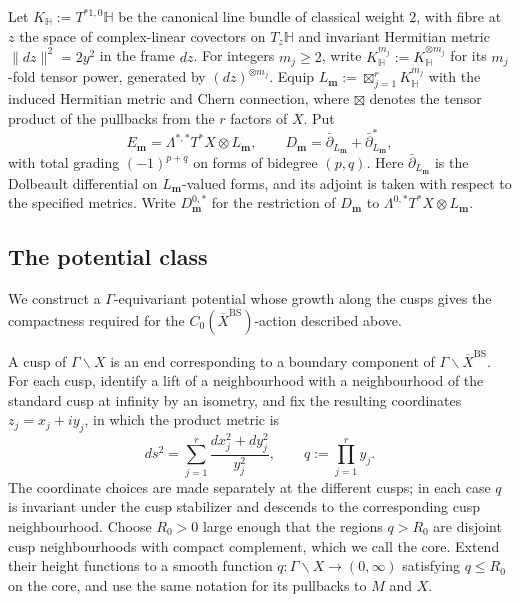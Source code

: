 \documentclass[11pt]{article}
\theoremstyle{definition}
\theoremstyle{plain}
\numberwithin{equation}{section}
\newcommand{\HH}{\mathbb H}
\newcommand{\BS}{\mathrm{BS}}
\begin{document}
Let $K_{\HH}:=T^{*1,0}\HH$ be the canonical line bundle of
classical weight $2$, with fibre at $z$ the space of
complex-linear covectors on $T_z\HH$ and invariant Hermitian
metric $\|dz\|^2=2y^2$ in the frame $dz$.
For integers $m_j\geq2$, write
$K_{\HH}^{m_j}:=K_{\HH}^{\otimes m_j}$ for its $m_j$-fold tensor
power, generated by $(dz)^{\otimes m_j}$.
Equip
$L_{\boldsymbol m}:=\boxtimes_{j=1}^rK_{\HH}^{m_j}$
with the induced Hermitian metric and Chern connection,
where $\boxtimes$ denotes the tensor product of the pullbacks
from the $r$ factors of $X$.  Put
\begin{equation}\label{eq:model}
 E_{\boldsymbol m}=\Lambda^{*,*}T^*X\otimes L_{\boldsymbol m},
 \qquad D_{\boldsymbol m}=\bar\partial_{L_{\boldsymbol m}}
                          +\bar\partial_{L_{\boldsymbol m}}^*,
\end{equation}
with total grading $(-1)^{p+q}$ on forms of bidegree $(p,q)$.
Here $\bar\partial_{L_{\boldsymbol m}}$ is the Dolbeault
differential on $L_{\boldsymbol m}$-valued forms, and its adjoint
is taken with respect to the specified metrics.
Write $D_{\boldsymbol m}^{0,*}$ for the restriction of
$D_{\boldsymbol m}$ to
$\Lambda^{0,*}T^*X\otimes L_{\boldsymbol m}$.

\subsection{The potential class}
\label{subsec:potential}

We construct a $\Gamma$-equivariant potential whose growth
along the cusps gives the compactness required for the
$C_0(\overline X^{\BS})$-action described above.

A cusp of $\Gamma\backslash X$ is an end corresponding to a
boundary component of $\Gamma\backslash\overline X^{\BS}$.
For each cusp, identify a lift of a neighbourhood with a
neighbourhood of the standard cusp at infinity by an isometry,
and fix the resulting coordinates $z_j=x_j+iy_j$, in which
the product metric is
\[
 ds^2=\sum_{j=1}^r\frac{dx_j^2+dy_j^2}{y_j^2},
 \qquad q:=\prod_{j=1}^r y_j.
\]
The coordinate choices are made separately at the different
cusps; in each case $q$ is invariant under the cusp stabilizer
and descends to the corresponding cusp neighbourhood.
Choose $R_0>0$ large enough that the regions $q>R_0$ are
disjoint cusp neighbourhoods with compact complement, which
we call the core.  Extend their height functions to a smooth
function $q:\Gamma\backslash X\to(0,\infty)$ satisfying
$q\leq R_0$ on the core, and use the same notation for its
pullbacks to $M$ and $X$.
\end{document}
